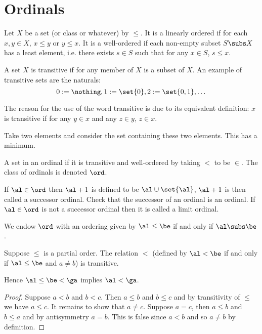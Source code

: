 \section{Ordinals}
\cite{jech}

\begin{dfn}
    Let $X$ be a set (or class or whatever) 
    by $\leq$. 
    It is a linearly ordered if for each $x, y \in X$, 
    $x \leq y$ or $y \leq x$.
    It is a well-ordered if each non-empty subset $S \subs X$ 
    has a least element,
    i.e. there exists $s \in S$ such that for any $x \in S$, $s \leq x$.

    A set $X$ is transitive if for any member of $X$ is a subset of $X$.
    An example of transitive sets are the naturals:
    \[0 := \nothing, 1 := \set{0}, 2:= \set{0,1}, \dots\]

\end{dfn}

\begin{ex}[Transitive]
    The reason for the use of the word transitive is due 
    to its equivalent definition: 
    $x$ is transitive if for any $y \in x$ and any $z \in y$, $z \in x$.
\end{ex}


\begin{ex}
    Take two elements and consider
    the set containing these two elements. 
    This has a minimum.
\end{ex}

\begin{dfn}
    A set in an ordinal if it is transitive and well-ordered by taking 
    $<$ to be $\in$.
    The class of ordinals is denoted $\ord$.

    If $\al \in \ord$ then $\al + 1$ is defined to be $\al \cup \set{\al}$,
    $\al + 1$ is then called a successor ordinal.
    Check that the successor of an ordinal is an ordinal.
    If $\al \in \ord$ is not a successor ordinal then 
    it is called a limit ordinal.

    We endow $\ord$ with an ordering given by 
    $\al \leq \be$ if and only if $\al \subs \be$.
\end{dfn}

\begin{lem}[Transitivity of $<$]
    Suppose $\leq$ is a partial order.
    The relation $<$ (defined by $\al < \be$ if and only if $\al \leq \be$ and 
    $a \ne b$) is transitive.

    Hence $\al \leq \be < \ga$ implies $\al < \ga$.
\end{lem}
\begin{proof}
    Suppose $a < b$ and $b < c$.
    Then $a \leq b$ and $b \leq c$ and by transitivity of $\leq$ we have $a \leq c$.
    It remains to show that $a \ne c$.
    Suppose $a = c$, 
    then $a \leq b$ and $b \leq a$ and by antisymmetry $a = b$.
    This is false since $a < b$ and so $a \ne b$ by definition.
\end{proof}

